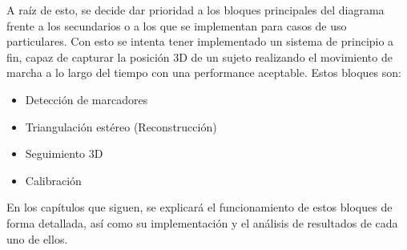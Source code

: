  A raíz de esto, se decide dar prioridad a los bloques principales del diagrama frente a los secundarios o a los que se implementan para casos de uso particulares. Con esto se intenta tener implementado un sistema de principio a fin, capaz de capturar la posición 3D de un sujeto realizando el movimiento de marcha a lo largo del tiempo con una performance aceptable. Estos bloques son:
 \begin{itemize}
 	\item Detección de marcadores
 	\item Triangulación estéreo (Reconstrucción)
 	\item Seguimiento 3D
 	\item Calibración
 \end{itemize}

En los capítulos que siguen, se explicará el funcionamiento de estos bloques de forma detallada, así como su implementación y el análisis de resultados de cada uno de ellos.